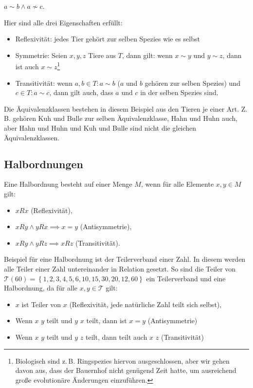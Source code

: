 \documentclass{scrartcl}
\begin{document}
$a \sim b \wedge a \not\sim c$.

Hier sind alle drei Eigenschaften erfüllt:

\begin{itemize}
	\item Reflexivität: jedes Tier gehört zur selben Spezies wie es selbst
	\item Symmetrie: Seien $x, y, z$ Tiere aus $T$, dann gilt: wenn $x \sim y$ und
		$y \sim z$, dann ist auch $x \sim z$\footnote{Biologisch
		sind z.\,B. Ringspezies hiervon ausgeschlossen, aber wir gehen
		davon aus, dass der Bauernhof nicht genügend Zeit hatte, um
		ausreichend große evolutionäre Änderungen einzuführen.}
	\item Transitivität: wenn $a, b \in T: a \sim b$ ($a$ und $b$ gehören
		zur selben Spezies) und $c \in T: a \sim c$, dann gilt auch,
		dass $a$ und $c$ in der selben Spezies sind.
\end{itemize}

Die Äquivalenzklassen bestehen in diesem Beispiel aus den Tieren je einer Art.
Z.\,B. gehören Kuh und Bulle zur selben Äquivalenzklasse, Hahn und Huhn auch, aber
Hahn und Huhn und Kuh und Bulle sind nicht die gleichen Äquivalenzklassen.

\subsection{Halbordnungen}

Eine Halbordnung besteht auf einer Menge $M$, wenn für alle Elemente $x, y \in M$
gilt:

\begin{itemize}
	\item $xRx$ (Reflexivität),
	\item $xRy \wedge yRx \implies x = y$ (Antisymmetrie),
	\item $xRy \wedge yRz \implies xRz$ (Transitivität).
\end{itemize}

Beispiel für eine Halbordnung ist der Teilerverband einer Zahl. In diesem
werden alle Teiler einer Zahl untereinander in Relation gesetzt. So sind
die Teiler von 
$\mathcal{T}(60) = \left\{1, 2, 3, 4, 5, 6, 10, 15, 30, 20, 12, 60\right\}$ 
ein Teilerverband und eine Halbordnung, da für alle $x, y \in \mathcal{T}$ gilt:

\begin{itemize}
	\item $x$ ist Teiler von $x$ (Reflexivität, jede natürliche Zahl teilt sich
		selbst),
	\item Wenn $x$ $y$ teilt und $y$ $x$ teilt, dann ist $x = y$ (Antisymmetrie)
	\item Wenn $x$ $y$ teilt und $y$ $z$ teilt, dann teilt auch 
		$x$ $z$ (Transitivität)
\end{itemize}
\end{document}
